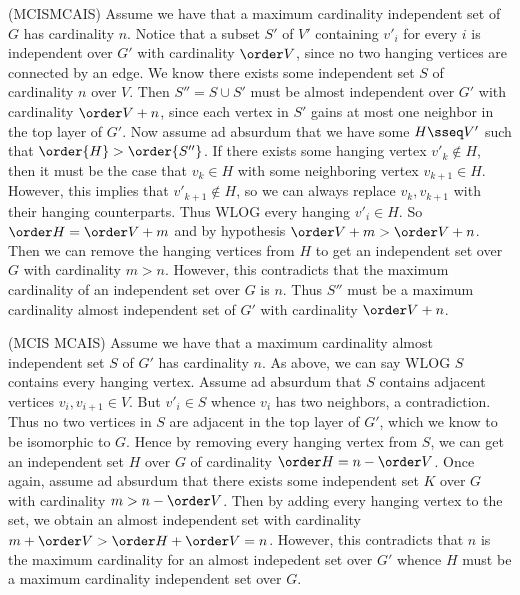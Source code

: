 \documentclass{article}
\begin{document}
\begin{solution}
  \begin{subproof}[Correctness.]
    (MCIS\imp MCAIS)
    Assume we have that a maximum cardinality independent set of $ G $ has cardinality $ n $.
    Notice that a subset $ S' $ of $ V' $ containing $ v'_i $ for every $ i $ is independent over $ G' $ with cardinality $ \order V $, since no two hanging vertices are connected by an edge.
    We know there exists some independent set $ S $ of cardinality $ n $ over $ V $.
    Then $ S'' = S\cup S' $ must be almost independent over $ G' $ with cardinality $ \order V + n $, since each vertex in $ S' $ gains at most one neighbor in the top layer of $ G' $.
    Now assume ad absurdum that we have some $ H\sseq V' $ such that $ \order{H} > \order{S''} $.
    If there exists some hanging vertex $ v'_k\not\in H $, then it must be the case that $ v_k\in H $ with some neighboring vertex $ v_{k+1}\in H $.
    However, this implies that $ v'_{k+1}\not\in H $, so we can always replace $ v_k,v_{k+1} $ with their hanging counterparts.
    Thus WLOG every hanging $ v'_i\in H $.
    So $ \order H = \order V + m $ and by hypothesis $ \order V + m > \order V + n $.
    Then we can remove the hanging vertices from $ H $ to get an independent set over $ G $ with cardinality $ m > n $.
    However, this contradicts that the maximum cardinality of an independent set over $ G $ is $ n $.
    Thus $ S'' $ must be a maximum cardinality almost independent set of $ G' $ with cardinality $ \order V + n $.

    (MCIS \pmi MCAIS)
    Assume we have that a maximum cardinality almost independent set $ S $ of $ G' $ has cardinality $ n $.
    As above, we can say WLOG $ S $ contains every hanging vertex.
    Assume ad absurdum that $ S $ contains adjacent vertices $ v_i,v_{i+1} \in V $.
    But $ v'_i \in S $ whence $ v_i $ has two neighbors, a contradiction.
    Thus no two vertices in $ S $ are adjacent in the top layer of $ G' $, which we know to be isomorphic to $ G $.
    Hence by removing every hanging vertex from $ S $, we can get an independent set $ H $ over $ G $ of cardinality $ \order H = n - \order V $.
    Once again, assume ad absurdum that there exists some independent set $ K $ over $ G $ with cardinality $ m > n-\order V $.
    Then by adding every hanging vertex to the set, we obtain an almost independent set with cardinality $ m+\order V > \order H + \order V = n $.
    However, this contradicts that $ n $ is the maximum cardinality for an almost indepedent set over $ G' $ whence $ H $ must be a maximum cardinality independent set over $ G $.
  \end{subproof}
\end{solution}
\pagebreak
\end{document}
